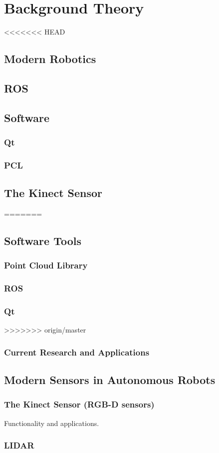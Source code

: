 \chapter{Background Theory}
\label{chp:theory} 

<<<<<<< HEAD
\section{Modern Robotics}

\section{ROS}

\section{Software}

\subsection{Qt}

\subsection{PCL}

\section{The Kinect Sensor}
=======
\section{Software Tools}

\subsection{Point Cloud Library}

\subsection{ROS}

\subsection{Qt}
>>>>>>> origin/master

\subsection{Current Research and Applications}

\section{Modern Sensors in Autonomous Robots}

\subsection{The Kinect Sensor (RGB-D sensors)}
Functionality and applications.

\subsection{LIDAR}



